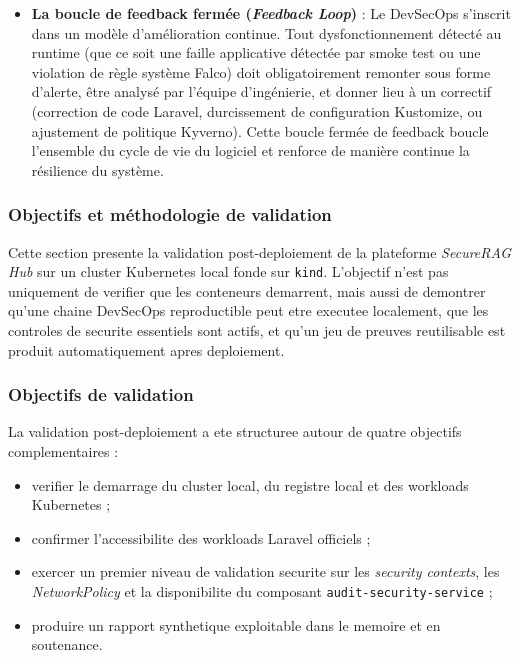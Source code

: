 \begin{itemize}
  \item \textbf{La boucle de feedback fermée (\textit{Feedback Loop})} : Le DevSecOps s'inscrit dans un modèle d'amélioration continue. Tout dysfonctionnement détecté au runtime (que ce soit une faille applicative détectée par smoke test ou une violation de règle système Falco) doit obligatoirement remonter sous forme d'alerte, être analysé par l'équipe d'ingénierie, et donner lieu à un correctif (correction de code Laravel, durcissement de configuration Kustomize, ou ajustement de politique Kyverno). Cette boucle fermée de feedback boucle l'ensemble du cycle de vie du logiciel et renforce de manière continue la résilience du système.
\end{itemize}

\subsubsection{Objectifs et méthodologie de validation}
\label{subsubsec:objectifs-methodologie-validation}

Cette section presente la validation post-deploiement de la plateforme \textit{SecureRAG Hub} sur un cluster Kubernetes local fonde sur \texttt{kind}. L'objectif n'est pas uniquement de verifier que les conteneurs demarrent, mais aussi de demontrer qu'une chaine DevSecOps reproductible peut etre executee localement, que les controles de securite essentiels sont actifs, et qu'un jeu de preuves reutilisable est produit automatiquement apres deploiement.

\subsubsection{Objectifs de validation}
\label{subsubsec:objectifs-validation-detail}

La validation post-deploiement a ete structuree autour de quatre objectifs complementaires :

\begin{itemize}
  \item verifier le demarrage du cluster local, du registre local et des workloads Kubernetes ;
  \item confirmer l'accessibilite des workloads Laravel officiels ;
  \item exercer un premier niveau de validation securite sur les \textit{security contexts}, les \textit{NetworkPolicy} et la disponibilite du composant \texttt{audit-security-service} ;
  \item produire un rapport synthetique exploitable dans le memoire et en soutenance.
\end{itemize}

